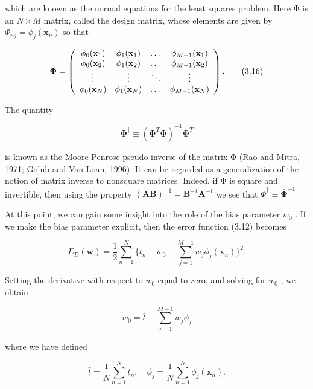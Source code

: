 \documentclass[
  10
]{article}
\begin{document}
which are known as the normal equations for the least squares problem.
Here Φ is an \(N \times M\) matrix, called the design matrix, whose
elements are given by
\(\Phi _ { n j } = \phi _ { j } ( \mathbf { x } _ { n } )\) so that

\[
\boldsymbol {\Phi} = \left( \begin{array}{c c c c} \phi_ {0} (\mathbf {x} _ {1}) & \phi_ {1} (\mathbf {x} _ {1}) & \dots & \phi_ {M - 1} (\mathbf {x} _ {1}) \\ \phi_ {0} (\mathbf {x} _ {2}) & \phi_ {1} (\mathbf {x} _ {2}) & \dots & \phi_ {M - 1} (\mathbf {x} _ {2}) \\ \vdots & \vdots & \ddots & \vdots \\ \phi_ {0} (\mathbf {x} _ {N}) & \phi_ {1} (\mathbf {x} _ {N}) & \dots & \phi_ {M - 1} (\mathbf {x} _ {N}) \end{array} \right).\tag{3.16}
\]

The quantity

\[
\boldsymbol {\Phi} ^ {\dagger} \equiv \left(\boldsymbol {\Phi} ^ {T} \boldsymbol {\Phi}\right) ^ {- 1} \boldsymbol {\Phi} ^ {T}\tag{3.17}
\]

is known as the Moore-Penrose pseudo-inverse of the matrix Φ (Rao and
Mitra, 1971; Golub and Van Loan, 1996). It can be regarded as a
generalization of the notion of matrix inverse to nonsquare matrices.
Indeed, if Φ is square and invertible, then using the property
\(( \mathbf { A } \mathbf { B } ) ^ { - 1 } = \mathbf { B } ^ { - 1 } \mathbf { A } ^ { - 1 }\)
we see that
\(\bar { \Phi } ^ { \dagger } \equiv \mathbf { \bar { \Phi } } ^ { - 1 }\)

At this point, we can gain some insight into the role of the bias
parameter \(w _ { 0 }\) . If we make the bias parameter explicit, then
the error function (3.12) becomes

\[
E _ {D} (\mathbf {w}) = \frac {1}{2} \sum_ {n = 1} ^ {N} \{t _ {n} - w _ {0} - \sum_ {j = 1} ^ {M - 1} w _ {j} \phi_ {j} (\mathbf {x} _ {n}) \} ^ {2}.\tag{3.18}
\]

Setting the derivative with respect to \(w _ { 0 }\) equal to zero, and
solving for \(w _ { 0 }\) , we obtain

\[
w _ {0} = \bar {t} - \sum_ {j = 1} ^ {M - 1} w _ {j} \overline {{\phi_ {j}}}\tag{3.19}
\]

where we have defined

\[
\bar {t} = \frac {1}{N} \sum_ {n = 1} ^ {N} t _ {n}, \quad \overline {{\phi_ {j}}} = \frac {1}{N} \sum_ {n = 1} ^ {N} \phi_ {j} (\mathbf {x} _ {n}).\tag{3.20}
\]
\end{document}
